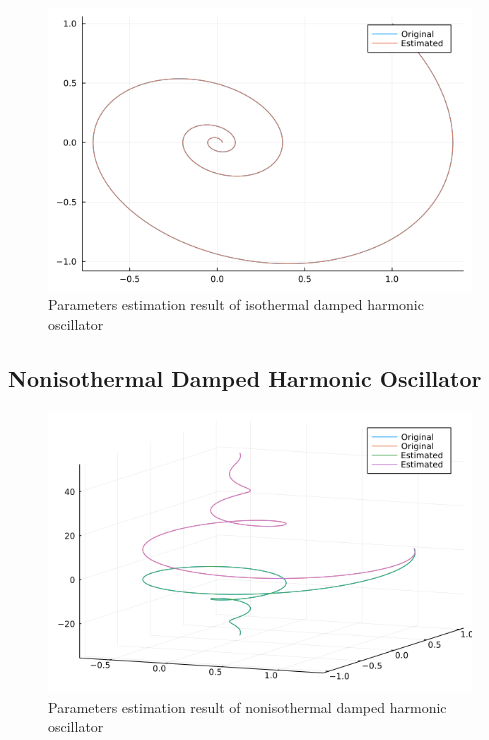 \begin{figure}[h!]
    \centering
    \includegraphics[scale=0.5]{figures/4_Params_Estimation/2_params_estimation_result.png}
    \caption{Parameters estimation result of isothermal damped harmonic oscillator}
    \label{fig:params_est_idho}
\end{figure}


\clearpage
\subsection{Nonisothermal Damped Harmonic Oscillator}

\begin{figure}[h!]
    \centering
    \includegraphics[scale=0.5]{figures/4_Params_Estimation/3_params_estimation_result.png}
    \caption{Parameters estimation result of nonisothermal damped harmonic oscillator}
    \label{fig:params_est_ndho}
\end{figure}

